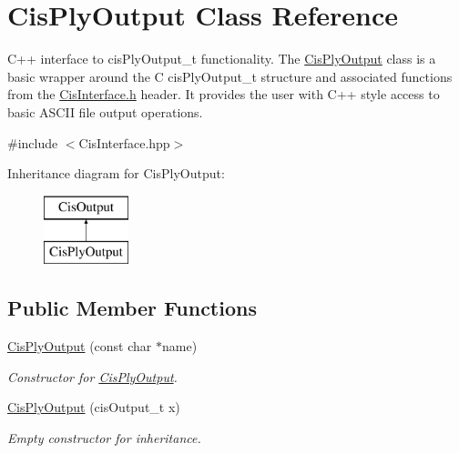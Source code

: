 \hypertarget{classCisPlyOutput}{}\section{Cis\+Ply\+Output Class Reference}
\label{classCisPlyOutput}


C++ interface to cis\+Ply\+Output\+\_\+t functionality. The \mbox{\hyperlink{classCisPlyOutput}{Cis\+Ply\+Output}} class is a basic wrapper around the C cis\+Ply\+Output\+\_\+t structure and associated functions from the \mbox{\hyperlink{CisInterface_8h_source}{Cis\+Interface.\+h}} header. It provides the user with C++ style access to basic A\+S\+C\+II file output operations.  




{\ttfamily \#include $<$Cis\+Interface.\+hpp$>$}

Inheritance diagram for Cis\+Ply\+Output\+:\begin{figure}[H]
\begin{center}
\leavevmode
\includegraphics[height=2.000000cm]{classCisPlyOutput}
\end{center}
\end{figure}
\subsection*{Public Member Functions}
\begin{DoxyCompactItemize}
\item 
\mbox{\hyperlink{classCisPlyOutput_ae15d8b2786ee6353496795261861e840}{Cis\+Ply\+Output}} (const char $\ast$name)
\begin{DoxyCompactList}\small\item\em Constructor for \mbox{\hyperlink{classCisPlyOutput}{Cis\+Ply\+Output}}. \end{DoxyCompactList}\item 
\mbox{\label{classCisPlyOutput_abf07624890d145e13a036b2b3640c134}} 
\mbox{\hyperlink{classCisPlyOutput_abf07624890d145e13a036b2b3640c134}{Cis\+Ply\+Output}} (cis\+Output\+\_\+t x)
\begin{DoxyCompactList}\small\item\em Empty constructor for inheritance. \end{DoxyCompactList}\end{DoxyCompactItemize}



